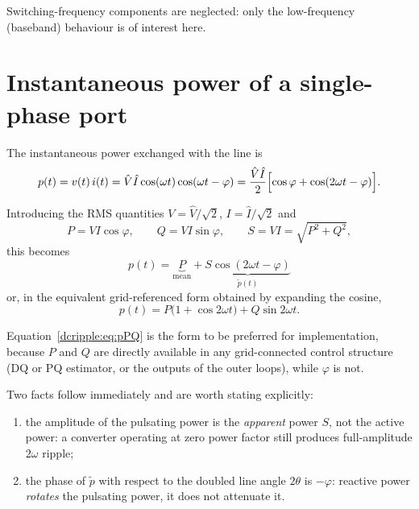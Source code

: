 Switching-frequency components are neglected: only the low-frequency (baseband)
behaviour is of interest here.

\section{Instantaneous power of a single-phase port}

The instantaneous power exchanged with the line is
\begin{equation}
  p(t) = v(t)\, i(t)
       = \hat V \hat I \cos(\omega t)\cos(\omega t - \varphi)
       = \frac{\hat V \hat I}{2}\Bigl[\cos\varphi + \cos(2\omega t - \varphi)\Bigr].
\end{equation}

Introducing the RMS quantities $V=\hat V/\sqrt 2$, $I=\hat I/\sqrt 2$ and
\begin{equation}
  P = VI\cos\varphi, \qquad
  Q = VI\sin\varphi, \qquad
  S = VI = \sqrt{P^2+Q^2},
\end{equation}
this becomes
\begin{equation}
  \boxed{\;
  p(t) = \underbrace{P}_{\text{mean}}
       + \underbrace{S\cos(2\omega t - \varphi)}_{\tilde p(t)} \;}
  \label{dcripple:eq:p}
\end{equation}
or, in the equivalent grid-referenced form obtained by expanding the cosine,
\begin{equation}
  p(t) = P\bigl(1 + \cos 2\omega t\bigr) + Q \sin 2\omega t .
  \label{dcripple:eq:pPQ}
\end{equation}

Equation~\eqref{dcripple:eq:pPQ} is the form to be preferred for implementation, because
$P$ and $Q$ are directly available in any grid-connected control structure
(DQ or PQ estimator, or the outputs of the outer loops), while $\varphi$ is not.

Two facts follow immediately and are worth stating explicitly:
\begin{enumerate}
  \item the amplitude of the pulsating power is the \emph{apparent} power $S$,
        not the active power: a converter operating at zero power factor still
        produces full-amplitude $2\omega$ ripple;
  \item the phase of $\tilde p$ with respect to the doubled line angle $2\theta$
        is $-\varphi$: reactive power \emph{rotates} the pulsating power, it does
        not attenuate it.
\end{enumerate}

